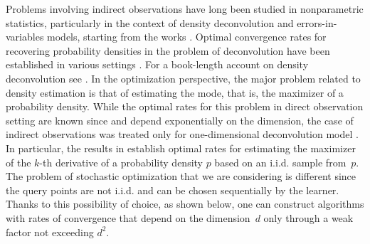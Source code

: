 \documentclass{article}
\makeatletter
\newcommand{\iid}{i.i.d.\@\xspace}
\theoremstyle{definition}
\makeatother
\begin{document}

Problems involving indirect observations have long been studied in nonparametric statistics, particularly in the context of density deconvolution and errors-in-variables models, starting from the works \citep{carroll1988optimal,devroye1989consistent,stefanski1990rates}. Optimal convergence rates for recovering probability densities in the problem of deconvolution have been established in various settings \citep{butucea2008sharp,Lepski2019OracleIA}. For a book-length account on density deconvolution see \citep{Meister2009DeconvolutionPI}. In the optimization perspective, the major problem related to density estimation is that of estimating the mode, that is, the maximizer of a probability density. While the optimal rates for this problem in direct observation setting are known since \cite{tsybakov1990recursive} and depend exponentially on the dimension, the case of indirect observations was treated only for one-dimensional deconvolution model \citep{wieczorek2010optimal}. In particular, the results in \citep{wieczorek2010optimal} establish optimal rates for estimating the maximizer of the $k$-th derivative of a probability density $p$ based on an i.i.d. sample from~$p$. The problem of stochastic optimization that we are considering is different since the query points are not i.i.d. and can be chosen sequentially by the learner. Thanks to this possibility of choice, as shown below, one can construct algorithms with rates of convergence that depend on the dimension~$d$ only through a weak factor not exceeding 
$d^2$. 
\end{document}

